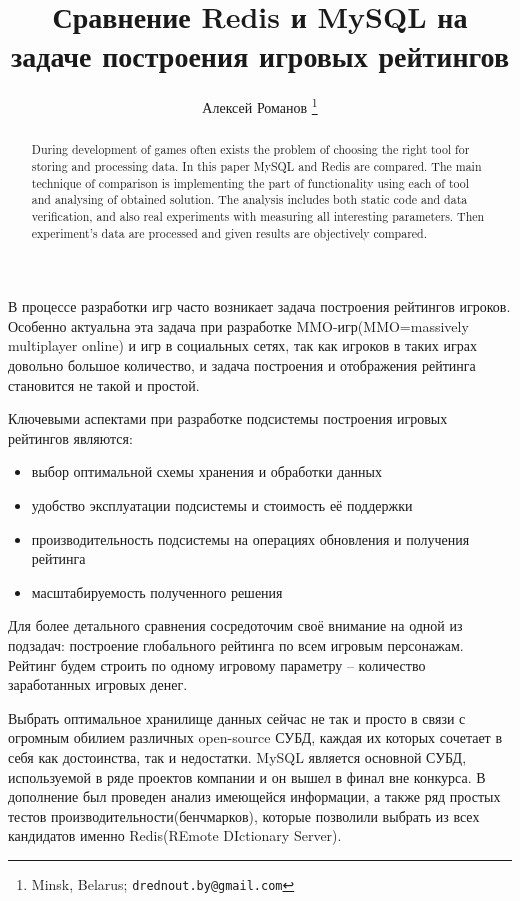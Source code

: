 \documentclass[10pt, a5paper]{article}
\begin{document}
\title{Сравнение Redis и MySQL на задаче построения игровых рейтингов}
\author{Алексей Романов \footnote{Minsk, Belarus; {\tt drednout.by@gmail.com}}}
\maketitle
\begin{abstract}
During development of games often exists the problem of choosing the right tool for storing and processing data. In this paper MySQL and Redis are compared. The main technique of comparison is implementing the part of functionality using each of tool and analysing of obtained solution. The analysis includes both static code and data verification, and also real experiments with measuring all interesting parameters. Then experiment's data are processed and given results are  objectively compared.
\end{abstract}
В процессе разработки игр часто возникает задача построения рейтингов игроков. Особенно актуальна эта задача при разработке MMO-игр(MMO=massively multiplayer online) и игр в социальных сетях, так как игроков в таких играх довольно большое количество, и задача построения и отображения рейтинга становится не такой и простой.

Ключевыми аспектами при разработке подсистемы построения игровых рейтингов являются:

\begin{itemize}
  \item выбор оптимальной схемы хранения и обработки данных
  \item удобство эксплуатации подсистемы и стоимость её поддержки
  \item производительность подсистемы на операциях обновления и получения рейтинга
  \item масштабируемость полученного решения
\end{itemize}

Для более детального сравнения сосредоточим своё внимание на одной из подзадач: построение глобального рейтинга по всем игровым персонажам. Рейтинг будем строить по одному игровому параметру -- количество заработанных игровых денег.

Выбрать оптимальное хранилище данных сейчас не так и просто в связи с огромным обилием различных open-source СУБД, каждая их которых сочетает в себя как достоинства, так и недостатки. MySQL является основной СУБД, используемой в ряде проектов компании и он вышел в финал вне конкурса. В дополнение был проведен анализ имеющейся информации, а также ряд простых тестов производительности(бенчмарков), которые позволили выбрать из всех кандидатов именно Redis(REmote DIctionary Server).
\end{document}
